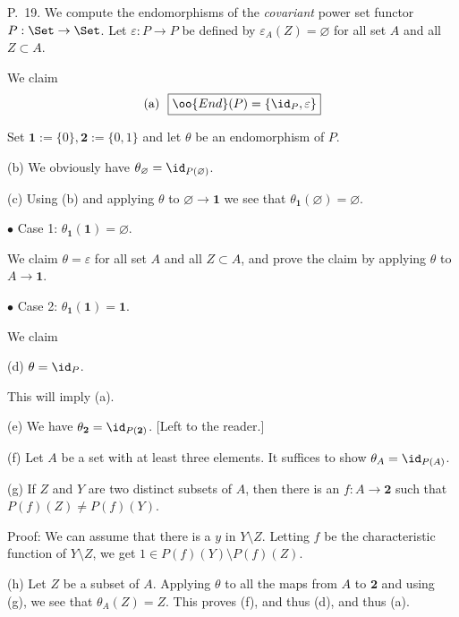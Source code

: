 \documentclass[12pt]{article}
\theoremstyle{remark}
\theoremstyle{definition}
\begin{document}
%

\begin{s}
P.~19. We compute the endomorphisms of the \emph{covariant} power set functor $P:\Set\to\Set$. Let $\varepsilon:P\to P$ be defined by $\varepsilon_A(Z)=\varnothing$ for all set $A$ and all $Z\subset A$.

\nn We claim 
$$
\text{(a) }\ \boxed{\oo{End}(P)=\{\id_P,\varepsilon\}}
$$ 

\nn Set $\mathbf 1:=\{0\},\mathbf 2:=\{0,1\}$ and let $\theta$ be an endomorphism of $P$.

\nn(b) We obviously have $\theta_\varnothing=\id_{P(\varnothing)}$.

\nn(c) Using (b) and applying $\theta$ to $\varnothing\to\mathbf 1$ we see that $\theta_{\mathbf 1}(\varnothing)=\varnothing$. 

\nn $\bullet$ Case 1: $\theta_{\mathbf 1}(\mathbf 1)=\varnothing$. 

\nn We claim $\theta=\varepsilon$ for all set $A$ and all $Z\subset A$, and prove the claim by applying $\theta$ to $A\to\mathbf 1$.

\nn $\bullet$ Case 2: $\theta_{\mathbf 1}(\mathbf 1)=\mathbf 1$. 

\nn We claim 

\nn(d) $\theta=\id_P$. 

\nn This will imply (a).

\nn(e) We have $\theta_{\mathbf 2}=\id_{P(\mathbf 2)}$. [Left to the reader.]

\nn(f) Let $A$ be a set with at least three elements. It suffices to show $\theta_A=\id_{P(A)}$.

\nn(g) If $Z$ and $Y$ are two distinct subsets of $A$, then there is an $f:A\to\mathbf 2$ such that $P(f)(Z)\ne P(f)(Y)$. 

\nn Proof: We can assume that there is a $y$ in $Y\setminus Z$. Letting $f$ be the characteristic function of $Y\setminus Z$, we get $1\in P(f)(Y)\setminus P(f)(Z)$.

\nn(h) Let $Z$ be a subset of $A$. Applying $\theta$ to all the maps from $A$ to $\mathbf 2$ and using (g), we see that $\theta_A(Z)=Z$. This proves (f), and thus (d), and thus (a).
\end{s}

%
\end{document}
